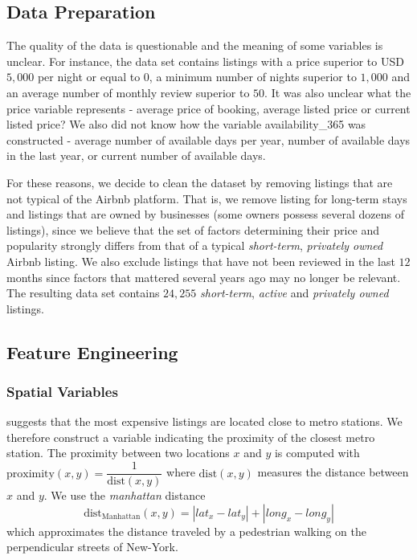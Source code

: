 \documentclass[10pt]{jmlr}%
\begin{document}
\subsection{Data Preparation}
\label{sec:data}
The quality of the data is questionable and the meaning of some variables is unclear. For instance, the data set contains listings with a price superior to USD$5,000$ per night or equal to $0$, a minimum number of nights superior to $1,000$ and an average number of monthly review superior to $50$. It was also unclear what the price variable represents - average price of booking, average listed price or current listed price? We also did not know how the variable availability\_365 was constructed - average number of available days per year, number of available days in the last year, or current number of available days.

For these reasons, we decide to clean the dataset by removing listings that are not typical of the Airbnb platform. That is, we remove listing for long-term stays and listings that are owned by businesses (some owners possess several dozens of listings), since we believe that the set of factors determining their price and popularity strongly differs from that of a typical \textit{short-term}, \textit{privately owned} Airbnb listing. We also exclude listings that have not been reviewed in the last $12$ months since factors that mattered several years ago may no longer be relevant. The resulting data set contains $24,255$ \textit{short-term}, \textit{active} and \textit{privately owned} listings.

\subsection{Feature Engineering}
\label{sec:feature}
\subsubsection{Spatial Variables}
 suggests that the most expensive listings are located close to metro stations. We therefore construct a variable indicating the proximity of the closest metro station. The proximity between two locations $x$ and $y$ is computed with
$\text{proximity}(x,y) = \dfrac{1}{\text{dist}(x,y)}$
where $\text{dist}(x,y)$ measures the distance between $x$ and $y$. We use the \textit{manhattan} distance
$$\text{dist}_{\text{Manhattan}}(x,y) = |lat_x - lat_y| + |long_x - long_y|$$
which approximates the distance traveled by a pedestrian walking on the perpendicular streets of New-York.
\end{document}
